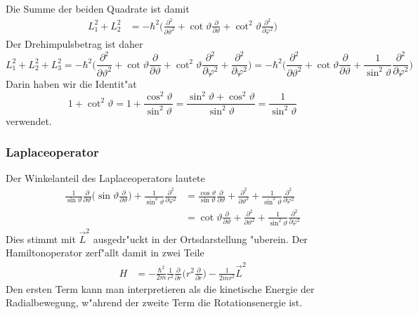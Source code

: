 Die Summe der beiden Quadrate ist damit
\begin{align*}
L_1^2+L_2^2
&=
-\hbar^2\biggl(
\frac{\partial^2}{\partial\vartheta^2}
+
\cot\vartheta\frac{\partial}{\partial\vartheta}
+
\cot^2\vartheta\frac{\partial^2}{\partial\varphi^2}
\biggr)
\end{align*}
Der Drehimpulsbetrag ist daher
\[
L_1^2+L_2^2+L_3^2
=
-\hbar^2\biggl(
\frac{\partial^2}{\partial\vartheta^2}
+
\cot\vartheta\frac{\partial}{\partial\vartheta}
+
\cot^2\vartheta\frac{\partial^2}{\partial\varphi^2}
+
\frac{\partial^2}{\partial\varphi^2}
\biggr)
=
-\hbar^2\biggl(
\frac{\partial^2}{\partial\vartheta^2}
+
\cot\vartheta\frac{\partial}{\partial\vartheta}
+
\frac1{\sin^2\vartheta}\frac{\partial^2}{\partial\varphi^2}
\biggr)
\]
Darin haben wir die Identit"at
\[
1+\cot^2\vartheta
=
1+\frac{\cos^2\vartheta}{\sin^2\vartheta}
=
\frac{\sin^2\vartheta+\cos^2\vartheta}{\sin^2\vartheta}
=
\frac{1}{\sin^2\vartheta}
\]
verwendet.

\subsubsection{Laplaceoperator}
Der Winkelanteil des Laplaceoperators lautete
\begin{align*}
\frac1{\sin\vartheta}\frac{\partial}{\partial\vartheta}\biggl(
\sin\vartheta\frac{\partial}{\partial\vartheta}
\biggr)
+\frac1{\sin^2\vartheta}\frac{\partial^2}{\partial\varphi^2}
&=
\frac{\cos\vartheta}{\sin\vartheta}\frac{\partial}{\partial\vartheta}
+
\frac{\partial^2}{\partial\vartheta^2}
+
\frac{1}{\sin^2\vartheta}\frac{\partial^2}{\partial\varphi^2}
\\
&=
\cot\vartheta\frac{\partial}{\partial\vartheta}
+
\frac{\partial^2}{\partial\vartheta^2}
+
\frac{1}{\sin^2\vartheta}\frac{\partial^2}{\partial\varphi^2}
\end{align*}
Dies stimmt mit $\vec L^2$ ausgedr"uckt in der Ortsdarstellung "uberein.
Der Hamiltonoperator zerf"allt damit in zwei Teile
\begin{align*}
H
&=-\frac{\hbar^2}{2m}
\frac1{r^2}\frac{\partial}{\partial r}\biggl(r^2\frac{\partial}{\partial r}\biggr)
-\frac{1}{2mr^2}\vec L^2
\end{align*}
Den ersten Term kann man interpretieren als die kinetische Energie
der Radialbewegung, w"ahrend der zweite Term die Rotationsenergie ist.

